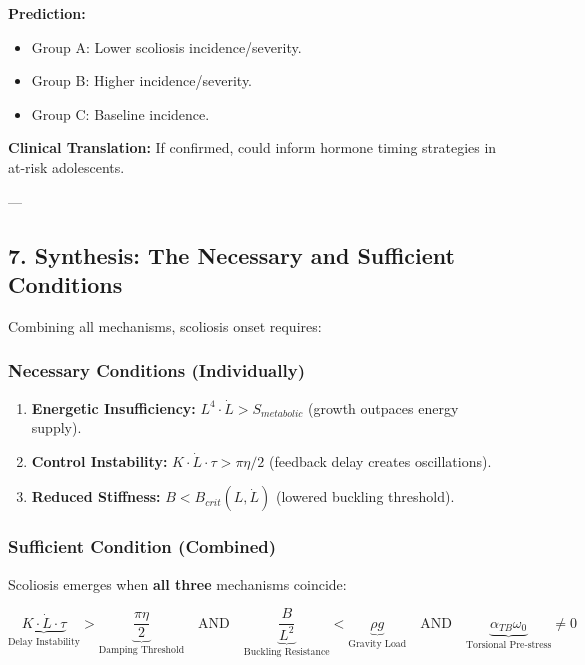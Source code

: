 \documentclass[11pt,a4paper]{article}
\begin{document}
\textbf{Prediction:}

\begin{itemize}
\item Group A: Lower scoliosis incidence/severity.
\item Group B: Higher incidence/severity.
\item Group C: Baseline incidence.
\end{itemize}

\textbf{Clinical Translation:} If confirmed, could inform hormone timing strategies in at-risk adolescents.

---

\subsection{7. Synthesis: The Necessary and Sufficient Conditions}

Combining all mechanisms, scoliosis onset requires:

\subsubsection{Necessary Conditions (Individually)}

\begin{enumerate}
\item \textbf{Energetic Insufficiency:} $L^4 \cdot \dot{L} > S_{metabolic}$ (growth outpaces energy supply).
\item \textbf{Control Instability:} $K \cdot \dot{L} \cdot \tau > \pi \eta / 2$ (feedback delay creates oscillations).
\item \textbf{Reduced Stiffness:} $B < B_{crit}(L, \dot{L})$ (lowered buckling threshold).
\end{enumerate}

\subsubsection{Sufficient Condition (Combined)}

Scoliosis emerges when \textbf{all three} mechanisms coincide:

$$
\boxed{
\underbrace{K \cdot \dot{L} \cdot \tau}_{\text{Delay Instability}} > \underbrace{\frac{\pi \eta}{2}}_{\text{Damping Threshold}} \quad \text{AND} \quad \underbrace{\frac{B}{L^2}}_{\text{Buckling Resistance}} < \underbrace{\rho g}_{\text{Gravity Load}} \quad \text{AND} \quad \underbrace{\alpha_{TB} \omega_0}_{\text{Torsional Pre-stress}} \neq 0
}
$$
\end{document}
